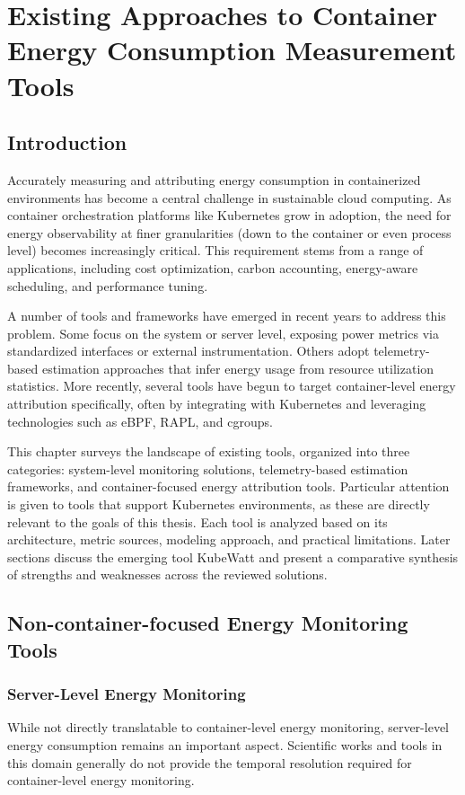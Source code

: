 \chapter{Existing Approaches to Container Energy Consumption Measurement Tools}
\label{Chapter4}

\section{Introduction}
\label{sec:tool-intro}

Accurately measuring and attributing energy consumption in containerized environments has become a central challenge in sustainable cloud computing. As container orchestration platforms like Kubernetes grow in adoption, the need for energy observability at finer granularities (down to the container or even process level) becomes increasingly critical. This requirement stems from a range of applications, including cost optimization, carbon accounting, energy-aware scheduling, and performance tuning.

A number of tools and frameworks have emerged in recent years to address this problem. Some focus on the system or server level, exposing power metrics via standardized interfaces or external instrumentation. Others adopt telemetry-based estimation approaches that infer energy usage from resource utilization statistics. More recently, several tools have begun to target container-level energy attribution specifically, often by integrating with Kubernetes and leveraging technologies such as eBPF, RAPL, and cgroups.

This chapter surveys the landscape of existing tools, organized into three categories: system-level monitoring solutions, telemetry-based estimation frameworks, and container-focused energy attribution tools. Particular attention is given to tools that support Kubernetes environments, as these are directly relevant to the goals of this thesis. Each tool is analyzed based on its architecture, metric sources, modeling approach, and practical limitations. Later sections discuss the emerging tool KubeWatt and present a comparative synthesis of strengths and weaknesses across the reviewed solutions.

\section{Non-container-focused Energy Monitoring Tools}
\label{sec:non-k8s-tools}
\subsection{Server-Level Energy Monitoring}
\label{sec:server-tools}
While not directly translatable to container-level energy monitoring, server-level energy consumption remains an important aspect. Scientific works and tools in this domain generally do not provide the temporal resolution required for container-level energy monitoring.

